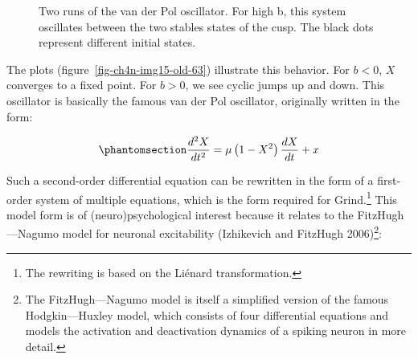 \documentclass[
  a4paper,
  DIV=11,
  numbers=noendperiod,
  oneside]{scrreprt}
\begin{document}
\begin{figure}


\caption{\label{fig-ch4n-img14-old-62}Two runs of the van der Pol
oscillator. For high b, this system oscillates between the two stables
states of the cusp. The black dots represent different initial states.}

\end{figure}%

The plots (figure~\ref{fig-ch4n-img15-old-63}) illustrate this behavior.
For \(b < 0\), \(X\) converges to a fixed point. For \(b > 0\), we see
cyclic jumps up and down. This oscillator is basically the famous van
der Pol oscillator, originally written in the form:

\begin{equation}\phantomsection\label{eq-ch4n-15-old-35}{
\frac{d^{2}X}{dt^{2}} = \mu\left( 1 - X^{2} \right)\frac{dX}{dt} + x
}\end{equation}

Such a second-order differential equation can be rewritten in the form
of a first-order system of multiple equations, which is the form
required for Grind.\footnote{The rewriting is based on the Liénard
  transformation.} This model form is of (neuro)psychological interest
because it relates to the FitzHugh---Nagumo model for neuronal
excitability (Izhikevich and FitzHugh 2006)\footnote{The
  FitzHugh---Nagumo model is itself a simplified version of the famous
  Hodgkin---Huxley model, which consists of four differential equations
  and models the activation and deactivation dynamics of a spiking
  neuron in more detail.}:
\end{document}

